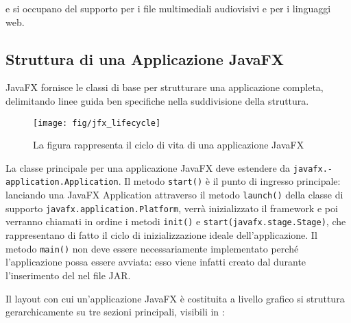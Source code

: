             e  si occupano del supporto per i file multimediali audiovisivi e per i linguaggi web.

        \subsection{Struttura di una Applicazione JavaFX}\label{subsec:jfxStruttura}

            JavaFX fornisce le classi di base per strutturare una applicazione completa, delimitando linee guida ben specifiche nella suddivisione della struttura.

            \begin{figure}[htbp]
                \centering
                \texttt{[image: fig/jfx\_lifecycle]}
                \caption{La figura rappresenta il ciclo di vita di una applicazione JavaFX}
                \label{fig:jfxLife}
            \end{figure}

            La classe principale per una applicazione JavaFX deve estendere da \texttt{javafx\dothyp application\dothyp Application}.
            Il metodo \texttt{start()} è il punto di ingresso principale:
            lanciando una JavaFX Application attraverso il metodo \texttt{launch()} della classe di supporto \texttt{javafx\dothyp application\dothyp Platform}, verrà inizializzato il framework e poi verranno chiamati in ordine i metodi \texttt{init()} e \texttt{start(javafx\dothyp stage\dothyp Stage)}, che rappresentano di fatto il ciclo di inizializzazione ideale dell'applicazione.
            Il metodo \texttt{main()} non deve essere necessariamente implementato perché l'applicazione possa essere avviata:
            esso viene infatti creato dal  durante l'inserimento del  nel file JAR.

            Il layout con cui un'applicazione JavaFX è costituita a livello grafico si struttura gerarchicamente su tre sezioni principali, visibili in :

